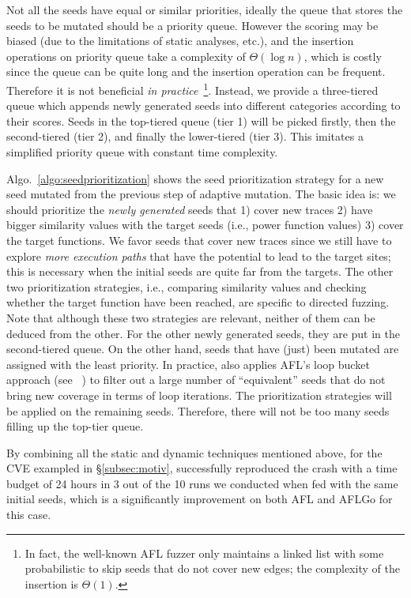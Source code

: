  Not all the seeds have equal or similar priorities, ideally the queue that stores the seeds to be mutated should be a priority queue. However the scoring may be biased (due to the limitations of static analyses, etc.), and the insertion operations on priority queue take a complexity of $\Theta(\log n)$, which is costly since the queue can be quite long and the insertion operation can be frequent. Therefore it is not beneficial \emph{in practice}~\footnote{In fact, the well-known AFL fuzzer only maintains a linked list with some probabilistic to skip seeds that do not cover new edges; the complexity of the  insertion  is $\Theta(1)$.}. Instead, we provide a three-tiered queue which appends newly generated seeds into different categories according to their scores. Seeds in the top-tiered queue (tier 1) will be picked firstly, then the second-tiered (tier 2), and finally the lower-tiered (tier 3). This imitates a simplified priority queue with constant time complexity.
 
 
 Algo.~\ref{algo:seedprioritization} shows the seed prioritization strategy for a new seed mutated from the previous step of adaptive mutation. The basic idea is: we should prioritize the \emph{newly generated} seeds that 1) cover new traces 2) have bigger similarity values with the target seeds (i.e., power function values) 3) cover the target functions. We favor seeds that cover new traces since we still have to explore \emph{more execution paths} that have the potential to lead to the target sites; this is necessary when the initial seeds are quite far from the targets. The other two prioritization strategies, i.e., comparing similarity values and checking whether the target function have been reached, are specific to directed fuzzing. Note that although these two strategies are relevant, neither of them can be deduced from the other. For the other newly generated seeds, they are put in the second-tiered queue. On the other hand, seeds that have (just) been mutated are assigned with the least priority.
In practice, \dFOT also applies AFL's loop bucket approach (see ~\cite{afl_detail}) to filter out a large number of ``equivalent'' seeds that do not bring new coverage in terms of loop iterations. The prioritization strategies will be applied on the remaining seeds. Therefore, there will not be too many seeds filling up the top-tier queue.

By combining all the static and dynamic techniques mentioned above, for the CVE exampled in \S\ref{subsec:motiv}, \dFOT successfully reproduced the crash with a time budget of 24 hours in 3 out of the 10 runs we conducted when fed with the same initial seeds, which is a significantly improvement on both AFL and AFLGo for this case.
 



